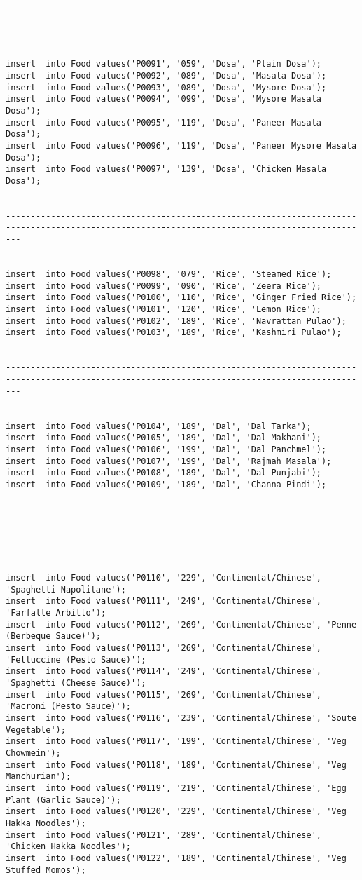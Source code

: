 \documentclass[a4,12pt]{report}
\begin{document}
\begin{lstlisting}
-----------------------------------------------------------------------------------------------------------------------------------------------


insert  into Food values('P0091', '059', 'Dosa', 'Plain Dosa');
insert  into Food values('P0092', '089', 'Dosa', 'Masala Dosa');
insert  into Food values('P0093', '089', 'Dosa', 'Mysore Dosa');
insert  into Food values('P0094', '099', 'Dosa', 'Mysore Masala Dosa');
insert  into Food values('P0095', '119', 'Dosa', 'Paneer Masala Dosa');
insert  into Food values('P0096', '119', 'Dosa', 'Paneer Mysore Masala Dosa');
insert  into Food values('P0097', '139', 'Dosa', 'Chicken Masala Dosa');


-----------------------------------------------------------------------------------------------------------------------------------------------


insert  into Food values('P0098', '079', 'Rice', 'Steamed Rice');
insert  into Food values('P0099', '090', 'Rice', 'Zeera Rice');
insert  into Food values('P0100', '110', 'Rice', 'Ginger Fried Rice');
insert  into Food values('P0101', '120', 'Rice', 'Lemon Rice');
insert  into Food values('P0102', '189', 'Rice', 'Navrattan Pulao');
insert  into Food values('P0103', '189', 'Rice', 'Kashmiri Pulao');


-----------------------------------------------------------------------------------------------------------------------------------------------


insert  into Food values('P0104', '189', 'Dal', 'Dal Tarka');
insert  into Food values('P0105', '189', 'Dal', 'Dal Makhani');
insert  into Food values('P0106', '199', 'Dal', 'Dal Panchmel');
insert  into Food values('P0107', '199', 'Dal', 'Rajmah Masala');
insert  into Food values('P0108', '189', 'Dal', 'Dal Punjabi');
insert  into Food values('P0109', '189', 'Dal', 'Channa Pindi');


-----------------------------------------------------------------------------------------------------------------------------------------------


insert  into Food values('P0110', '229', 'Continental/Chinese', 'Spaghetti Napolitane');
insert  into Food values('P0111', '249', 'Continental/Chinese', 'Farfalle Arbitto');
insert  into Food values('P0112', '269', 'Continental/Chinese', 'Penne (Berbeque Sauce)');
insert  into Food values('P0113', '269', 'Continental/Chinese', 'Fettuccine (Pesto Sauce)');
insert  into Food values('P0114', '249', 'Continental/Chinese', 'Spaghetti (Cheese Sauce)');
insert  into Food values('P0115', '269', 'Continental/Chinese', 'Macroni (Pesto Sauce)');
insert  into Food values('P0116', '239', 'Continental/Chinese', 'Soute Vegetable');
insert  into Food values('P0117', '199', 'Continental/Chinese', 'Veg Chowmein');
insert  into Food values('P0118', '189', 'Continental/Chinese', 'Veg Manchurian');
insert  into Food values('P0119', '219', 'Continental/Chinese', 'Egg Plant (Garlic Sauce)');
insert  into Food values('P0120', '229', 'Continental/Chinese', 'Veg Hakka Noodles');
insert  into Food values('P0121', '289', 'Continental/Chinese', 'Chicken Hakka Noodles');
insert  into Food values('P0122', '189', 'Continental/Chinese', 'Veg Stuffed Momos');



\end{lstlisting}
\end{document}
